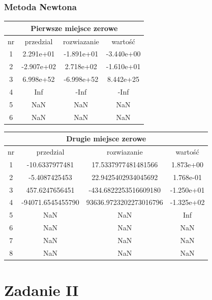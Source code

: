 \documentclass[11pt, oneside]{article}   	%
\begin{document}
\subsubsection{Metoda Newtona}

\begin{center}
\begin{tabular}{ |c|c|c|c| } 
\hline
\multicolumn{4}{|c|}{Pierwsze miejsce zerowe} \\
 \hline
 nr & przedzial & rozwiazanie & wartość \\
 \hline
  1 &    2.291e+01 &   -1.891e+01 &   -3.440e+00 \\ 
  2 &   -2.907e+02 &    2.718e+02 &   -1.610e+01 \\ 
  3 &    6.998e+52 &   -6.998e+52 &    8.442e+25 \\ 
  4 &          Inf &         -Inf &         -Inf \\ 
  5 &          NaN &          NaN &          NaN \\ 
  6 &          NaN &          NaN &          NaN \\ 
 \hline
\end{tabular}
\end{center}

\begin{center}
\begin{tabular}{ |c|c|c|c| } 
\hline
\multicolumn{4}{|c|}{Drugie miejsce zerowe} \\
 \hline
 nr & przedzial & rozwiazanie & wartość \\
 \hline
1 & -10.6337977481 & 17.5337977481481566 &    1.873e+00 \\ 
  2 & -5.4087425453 & 22.9425402934045692 &    1.768e-01 \\ 
  3 & 457.6247656451 & -434.6822253516609180 &   -1.250e+01 \\ 
  4 & -94071.6545455790 & 93636.9723202273016796 &   -1.325e+02 \\ 
  5 &          NaN &          NaN &          Inf \\ 
  6 &          NaN &          NaN &          NaN \\ 
  7 &          NaN &          NaN &          NaN \\ 
  8 &          NaN &          NaN &          NaN \\ 
   \hline
\end{tabular}
\end{center}

\section{Zadanie II}
\end{document}
